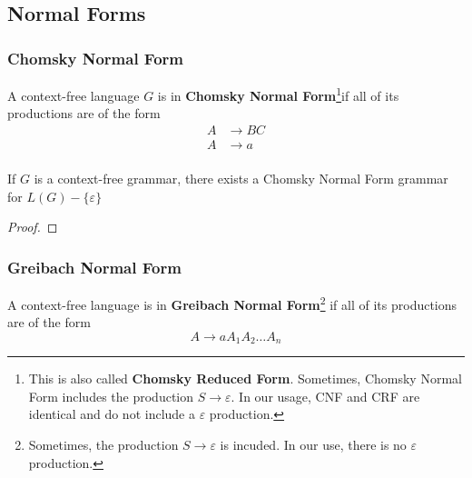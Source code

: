 \subsection{Normal Forms}\label{subsec:normal-forms}
\subsubsection{Chomsky Normal Form}\label{subsubsec:chomsky-normal-form}
\begin{definition}
    A context-free language \(G\) is in \textbf{Chomsky Normal Form}\footnote{This is also called \textbf{Chomsky Reduced Form}. Sometimes, Chomsky Normal Form includes the production \(S\to\varepsilon \). In our usage, CNF and CRF are identical and do not include a \(\varepsilon \) production.}if all of its productions are of the form 
    \begin{align*}A &\to BC\\
                  A &\to a\\
    \end{align*}
\end{definition}

\begin{theorem}
    If \(G\) is a context-free grammar, there exists a Chomsky Normal Form grammar for \(L(G)-\{\varepsilon \} \)
\end{theorem}

\begin{proof}

\end{proof}



\subsubsection{Greibach Normal Form}\label{subsubsec:greibach-normal-form}
\begin{definition}
    A context-free language is in \textbf{Greibach Normal Form}\footnote{Sometimes, the production \(S\to\varepsilon \) is incuded. In our use, there is no \(\varepsilon \) production.} if all of its productions are of the form
    \[A\to aA_1A_2\hdots A_n\]
\end{definition}